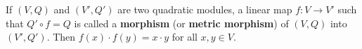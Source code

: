 If $(V,Q)$ and $(V',Q')$ are two quadratic modules, a linear map $f: V \to V'$ such that $Q' \circ f = Q$ is called a \textbf{morphism} (or \textbf{metric morphism}) of $(V,Q)$ into $(V',Q')$. Then $f(x) \cdot f(y) = x \cdot y$ for all $x,y \in V$.
